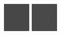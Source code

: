 \begin{figure}[ht]
\begin{center}
  \includegraphics[width=\columnwidth/11]{ch5/figures/2_Scaling_M.png}
  \includegraphics[width=\columnwidth/11]{ch5/figures/3_Scaling_M.png}

\end{center}
\end{figure}
